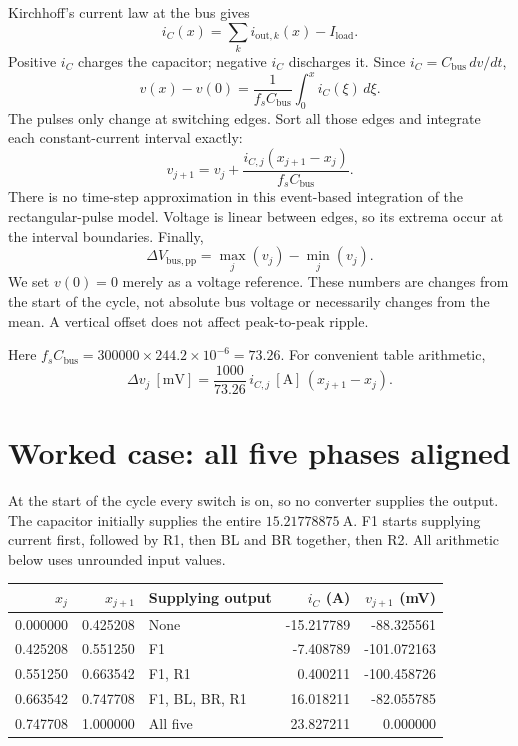 \documentclass[11pt,a4paper]{article}
\begin{document}
Kirchhoff's current law at the bus gives
\[
 \boxed{i_C(x)=\sum_k i_{\mathrm{out},k}(x)-I_{\mathrm{load}}}.
\]
Positive $i_C$ charges the capacitor; negative $i_C$ discharges it. Since
$i_C=C_{\mathrm{bus}}\,dv/dt$,
\[
 v(x)-v(0)=\frac{1}{f_s C_{\mathrm{bus}}}\int_0^x i_C(\xi)\,d\xi.
\]
The pulses only change at switching edges. Sort all those edges and integrate
each constant-current interval exactly:
\[
 \boxed{v_{j+1}=v_j+
        \frac{i_{C,j}(x_{j+1}-x_j)}{f_s C_{\mathrm{bus}}}}.
\]
There is no time-step approximation in this event-based integration of the
rectangular-pulse model. Voltage is linear between edges, so its extrema occur
at the interval boundaries. Finally,
\[
 \boxed{\Delta V_{\mathrm{bus,pp}}=\max_j(v_j)-\min_j(v_j)}.
\]
We set $v(0)=0$ merely as a voltage reference. These numbers are changes from
the start of the cycle, not absolute bus voltage or necessarily changes from
the mean. A vertical offset does not affect peak-to-peak ripple.

Here $f_s C_{\mathrm{bus}}=300000\times244.2\times10^{-6}=73.26$.
For convenient table arithmetic,
\[
 \Delta v_j\ [\mathrm{mV}]
 =\frac{1000}{73.26}\,i_{C,j}\ [\mathrm{A}]\,(x_{j+1}-x_j).
\]

\section{Worked case: all five phases aligned}

At the start of the cycle every switch is on, so no converter supplies the
output. The capacitor initially supplies the entire $15.21778875\ \mathrm{A}$.
F1 starts supplying current first, followed by R1, then BL and BR together,
then R2. All arithmetic below uses unrounded input values.

\begin{center}
\small
\begin{tabular}{rrlrr}
\toprule
$x_j$ & $x_{j+1}$ & Supplying output & $i_C$ (A) & $v_{j+1}$ (mV)\\
\midrule
0.000000 & 0.425208 & None & -15.217789 & -88.325561\\
0.425208 & 0.551250 & F1 & -7.408789 & -101.072163\\
0.551250 & 0.663542 & F1, R1 & 0.400211 & -100.458726\\
0.663542 & 0.747708 & F1, BL, BR, R1 & 16.018211 & -82.055785\\
0.747708 & 1.000000 & All five & 23.827211 & 0.000000\\
\bottomrule
\end{tabular}
\end{center}
\end{document}
